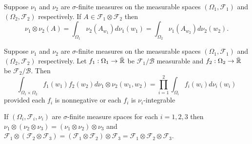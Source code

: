 \begin{corollary} Suppose $\nu_1$ and $\nu_2$ are $\sigma$-finite measures on the measurable spaces $(\Omega_1,\mathcal F_1)$ and  $( \Omega_2, \mathcal F_2)$ respectively. If $A\in \mathcal F_1\otimes \mathcal F_2$ then
\[\nu_1\otimes\nu_2(A) = \int_{\Omega_1} \nu_2(A_{w_1})d\nu_1(w_1)=  \int_{\Omega_2} \nu_1(A_{w_2})d\nu_2(w_2). \]
\end{corollary}





\begin{corollary} Suppose $\nu_1$ and $\nu_2$ are $\sigma$-finite measures on the measurable spaces $(\Omega_1,\mathcal F_1)$ and  $( \Omega_2, \mathcal F_2)$ respectively.
Let $f_1:\Omega_1\rightarrow \bar{\Bbb R}$ be $\mathcal F_1/\mathcal B$ measurable and $f_2:\Omega_2\rightarrow \bar{\Bbb R}$ be $\mathcal F_2/\mathcal B$. Then
\[ \int_{\Omega_1\times\Omega_2} \!\!\!\!f_1(w_1)f_2(w_2) d \nu_1\otimes\nu_2(w_1,w_2) = \prod_{i=1}^2 \int_{\Omega_i} f_i(w_i)d \nu_i(w_i)\]
provided each $f_i$ is nonnegative or each $f_i$ is $\nu_i$-integrable
\end{corollary}





\begin{theorem}
If $(\Omega_i,\mathcal F_i,\nu_i)$ are $\sigma$-finite measure spaces for each $i=1,2, 3$ then
$\nu_1\otimes (\nu_2\otimes\nu_3) = (\nu_1\otimes \nu_2)\otimes\nu_3$ and
\mbox{$\mathcal F_1\otimes (\mathcal F_2\otimes\mathcal F_3) = (\mathcal F_1\otimes \mathcal F_2)\otimes\mathcal F_3=\mathcal F_1\otimes \mathcal F_2\otimes\mathcal F_3$}.
\end{theorem}


